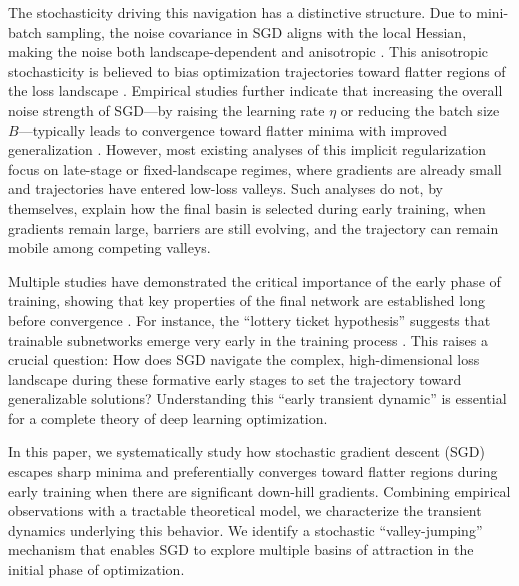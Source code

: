 \documentclass[aps,prx,reprint,superscriptaddress,longbibliography,nofootinbib,floatfix]{revtex4-2}
\begin{document}
The stochasticity driving this navigation has a distinctive structure. Due to mini-batch sampling, the noise covariance in SGD aligns with the local Hessian, making the noise both landscape-dependent and anisotropic \cite{zhuAnisotropicNoiseStochastic2019,xieDiffusionTheoryDeep2021,weiHowNoiseAffects2019,yangStochasticGradientDescent2023}. This anisotropic stochasticity is believed to bias optimization trajectories toward flatter regions of the loss landscape \cite{xieDiffusionTheoryDeep2021,zhuAnisotropicNoiseStochastic2019,yangStochasticGradientDescent2023}. Empirical studies further indicate that increasing the overall noise strength of SGD---by raising the learning rate $\eta$ or reducing the batch size $B$---typically leads to convergence toward flatter minima with improved generalization \cite{keskarLargeBatchTrainingDeep2017,chaudhariEntropySGDBiasingGradient2019,jastrzebskiThreeFactorsInfluencing2018}. However, most existing analyses of this implicit regularization focus on late-stage or fixed-landscape regimes, where gradients are already small and trajectories have entered low-loss valleys. Such analyses do not, by themselves, explain how the final basin is selected during early training, when gradients remain large, barriers are still evolving, and the trajectory can remain mobile among competing valleys.

Multiple studies have demonstrated the critical importance of the early phase of training, showing that key properties of the final network are established long before convergence \cite{gur-ariGradientDescentHappens2018,achilleCriticalLearningPeriods2019,fengPhasesLearningDynamics2021a,kalraPhaseDiagramEarly2023,jastrzebskiBreakEvenPointOptimization2020}. For instance, the ``lottery ticket hypothesis'' suggests that trainable subnetworks emerge very early in the training process \cite{frankleLotteryTicketHypothesis2019}. This raises a crucial question: How does SGD navigate the complex, high-dimensional loss landscape during these formative early stages to set the trajectory toward generalizable solutions? Understanding this ``early transient dynamic'' is essential for a complete theory of deep learning optimization.

In this paper, we systematically study how stochastic gradient descent (SGD) escapes sharp minima and preferentially converges toward flatter regions during early training when there are significant down-hill gradients. Combining empirical observations with a tractable theoretical model, we characterize the transient dynamics underlying this behavior. We identify a stochastic ``valley-jumping'' mechanism that enables SGD to explore multiple basins of attraction in the initial phase of optimization.
\end{document}
